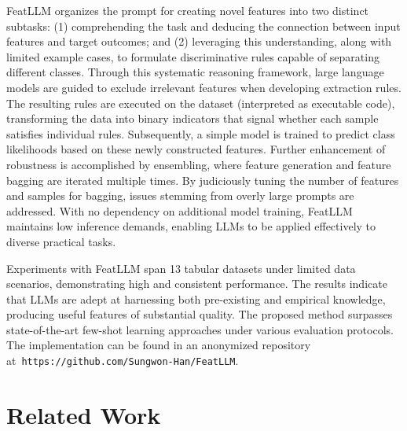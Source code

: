 \textsf{FeatLLM} organizes the prompt for creating novel features into two distinct subtasks: (1) comprehending the task and deducing the connection between input features and target outcomes; and (2) leveraging this understanding, along with limited example cases, to formulate discriminative rules capable of separating different classes. Through this systematic reasoning framework, large language models are guided to exclude irrelevant features when developing extraction rules. The resulting rules are executed on the dataset (interpreted as executable code), transforming the data into binary indicators that signal whether each sample satisfies individual rules. Subsequently, a simple model is trained to predict class likelihoods based on these newly constructed features. Further enhancement of robustness is accomplished by ensembling, where feature generation and feature bagging are iterated multiple times. By judiciously tuning the number of features and samples for bagging, issues stemming from overly large prompts are addressed. With no dependency on additional model training, \textsf{FeatLLM} maintains low inference demands, enabling LLMs to be applied effectively to diverse practical tasks.

Experiments with \textsf{FeatLLM} span 13 tabular datasets under limited data scenarios, demonstrating high and consistent performance. The results indicate that LLMs are adept at harnessing both pre-existing and empirical knowledge, producing useful features of substantial quality. The proposed method surpasses state-of-the-art few-shot learning approaches under various evaluation protocols. The implementation can be found in an anonymized repository at~\texttt{https://github.com/Sungwon-Han/FeatLLM}.

\section{Related Work}

